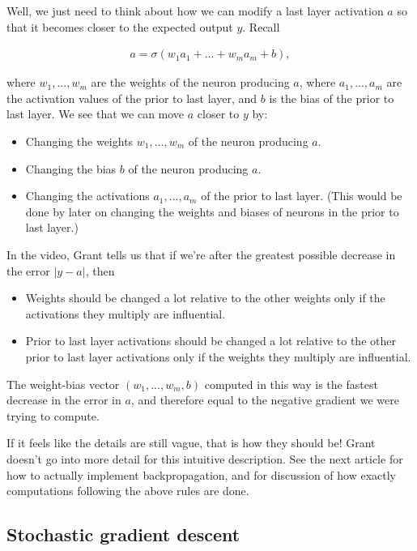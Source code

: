 \documentclass{article}
\begin{document}
	Well, we just need to think about how we can modify a last layer activation $a$ so that it becomes closer to the expected output $y$. Recall
	
	\begin{align*}
		a = \sigma(w_1 a_1 + ... + w_m a_m + b),
	\end{align*}
	
	where $w_1, ..., w_m$ are the weights of the neuron producing $a$, where $a_1, ..., a_m$ are the activation values of the prior to last layer, and $b$ is the bias of the prior to last layer. We see that we can move $a$ closer to $y$ by:
	
	\begin{itemize}
		\item Changing the weights $w_1, ..., w_m$ of the neuron producing $a$.
		\item Changing the bias $b$ of the neuron producing $a$.
		\item Changing the activations $a_1, ..., a_m$ of the prior to last layer. (This would be done by later on changing the weights and biases of neurons in the prior to last layer.)
	\end{itemize}
	
	In the video, Grant tells us that if we're after the greatest possible decrease in the error $|y - a|$, then 
	
	\begin{itemize}
		\item Weights should be changed a lot relative to the other weights only if the activations they multiply are influential.
		
		\item Prior to last layer activations should be changed a lot relative to the other prior to last layer activations only if the weights they multiply are influential.
	\end{itemize}
	
	The weight-bias vector $(w_1, ..., w_m, b)$ computed in this way is the fastest decrease in the error in $a$, and therefore equal to the negative gradient we were trying to compute.
	
	If it feels like the details are still vague, that is how they should be! Grant doesn't go into more detail for this intuitive description. See the next article for how to actually implement backpropagation, and for discussion of how exactly computations following the above rules are done.
	
	\subsection*{Stochastic gradient descent}
	
\end{document}
